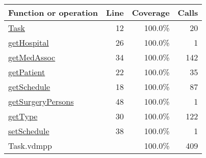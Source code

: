\begin{longtable}{|l|r|r|r|}
\hline
Function or operation & Line & Coverage & Calls \\
\hline
\hline
\hyperref[Task:12]{Task} & 12&100.0\% & 20 \\
\hline
\hyperref[getHospital:26]{getHospital} & 26&100.0\% & 1 \\
\hline
\hyperref[getMedAssoc:34]{getMedAssoc} & 34&100.0\% & 142 \\
\hline
\hyperref[getPatient:22]{getPatient} & 22&100.0\% & 35 \\
\hline
\hyperref[getSchedule:18]{getSchedule} & 18&100.0\% & 87 \\
\hline
\hyperref[getSurgeryPersons:48]{getSurgeryPersons} & 48&100.0\% & 1 \\
\hline
\hyperref[getType:30]{getType} & 30&100.0\% & 122 \\
\hline
\hyperref[setSchedule:38]{setSchedule} & 38&100.0\% & 1 \\
\hline
\hline
Task.vdmpp & & 100.0\% & 409 \\
\hline
\end{longtable}

